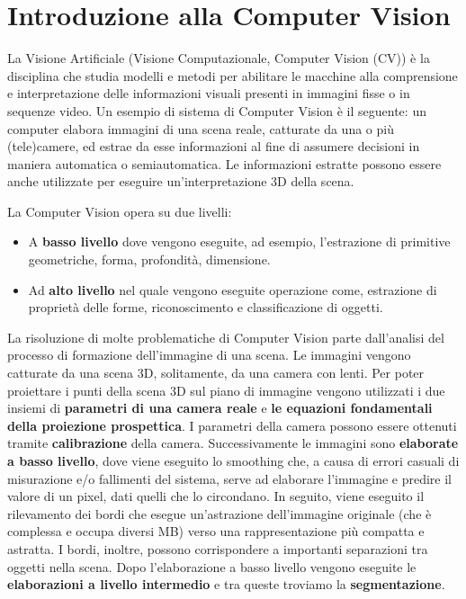 \documentclass{article}
\begin{document}
\thispagestyle{empty}

\newpage

\tableofcontents

\thispagestyle{empty}

\clearpage
{}


\section{Introduzione alla Computer Vision}
La Visione Artificiale (Visione Computazionale, Computer Vision (CV)) è la disciplina che studia
modelli e metodi per abilitare le macchine alla comprensione e interpretazione delle informazioni visuali presenti in immagini fisse o in sequenze video. 
Un esempio di sistema di Computer Vision è il seguente: un computer elabora immagini di una scena reale, catturate da una o più (tele)camere, ed estrae da esse informazioni al fine di assumere decisioni in maniera automatica o semiautomatica.
Le informazioni estratte possono essere anche utilizzate per eseguire un'interpretazione 3D della scena.

\begin{flushleft}
La Computer Vision opera su due livelli:
\end{flushleft}

\begin{itemize}[noitemsep]
 \item A \textbf{basso livello} dove vengono eseguite, ad esempio, l'estrazione di primitive geometriche, forma, profondità, dimensione.
 \item Ad \textbf{alto livello} nel quale vengono eseguite operazione come, estrazione di proprietà delle forme, riconoscimento e classificazione di oggetti.
\end{itemize}
La risoluzione di molte problematiche di Computer Vision parte dall’analisi del processo di formazione dell’immagine di una scena. Le immagini vengono catturate da una scena 3D, solitamente, da una camera con lenti. Per poter proiettare i punti della scena 3D sul piano di immagine vengono utilizzati i due insiemi di \textbf{parametri di una camera reale} e \textbf{le equazioni fondamentali della proiezione prospettica}. I parametri della camera possono essere ottenuti tramite \textbf{calibrazione} della camera.
Successivamente le immagini sono \textbf{elaborate a basso livello}, dove viene eseguito lo smoothing che, a causa di errori casuali di misurazione e/o fallimenti del sistema, serve ad elaborare l'immagine e predire il valore di un pixel, dati quelli che lo circondano. In seguito, viene eseguito il rilevamento dei bordi che esegue un’astrazione dell’immagine originale (che è complessa e occupa diversi MB) verso una rappresentazione più compatta e astratta. I bordi, inoltre, possono corrispondere a importanti separazioni tra oggetti nella scena. Dopo l'elaborazione a basso livello vengono eseguite le \textbf{elaborazioni a livello intermedio} e tra queste troviamo la \textbf{segmentazione}.
\end{document}

